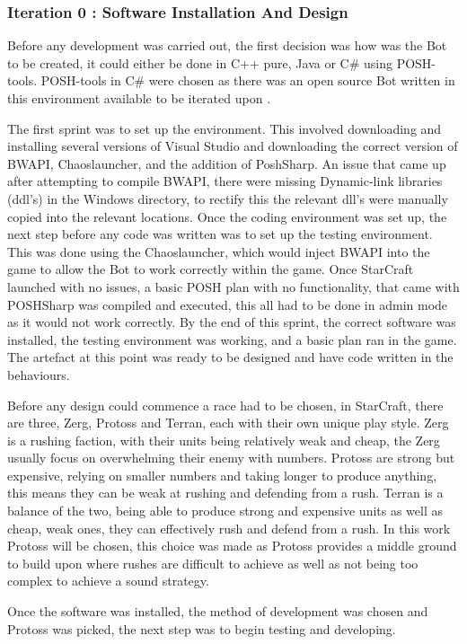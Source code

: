 \documentclass[journal]{IEEEtran}
\begin{document}
	\subsubsection{Iteration 0 : Software Installation And Design}
	Before any development was carried out, the first decision was how was the Bot to be created, it could either be done in C++ pure, Java or C\# using POSH-tools. POSH-tools in C\# were chosen as there was an open source Bot written in this environment available to be iterated upon \cite{Swen}.
	
	The first sprint was to set up the environment. This involved downloading and installing several versions of Visual Studio and downloading the correct version of BWAPI, Chaoslauncher, and the addition of PoshSharp. An issue that came up after attempting to compile BWAPI, there were missing Dynamic-link libraries (ddl's) in the Windows directory, to rectify this the relevant dll's were manually copied into the relevant locations. Once the coding environment was set up, the next step before any code was written was to set up the testing environment. This was done using the Chaoslauncher, which would inject BWAPI into the game to allow the Bot to work correctly within the game. Once StarCraft launched with no issues, a basic POSH plan with no functionality, that came with POSHSharp was compiled and executed, this all had to be done in admin mode as it would not work correctly. By the end of this sprint, the correct software was installed, the testing environment was working, and a basic plan ran in the game. The artefact at this point was ready to be designed and have code written in the behaviours.
	
	Before any design could commence a race had to be chosen, in StarCraft, there are three, Zerg, Protoss and Terran, each with their own unique play style. Zerg is a rushing faction, with their units being relatively weak and cheap, the Zerg usually focus on overwhelming their enemy with numbers. Protoss are strong but expensive, relying on smaller numbers and taking longer to produce anything, this means they can be weak at rushing and defending from a rush. Terran is a balance of the two, being able to produce strong and expensive units as well as cheap, weak ones, they can effectively rush and defend from a rush.	In this work Protoss will be chosen, this choice was made as Protoss provides a middle ground to build upon where rushes are difficult to achieve as well as not being too complex to achieve a sound strategy. 
		
	Once the software was installed, the method of development was chosen and Protoss was picked, the next step was to begin testing and developing. 
	\newline
	
\end{document}
